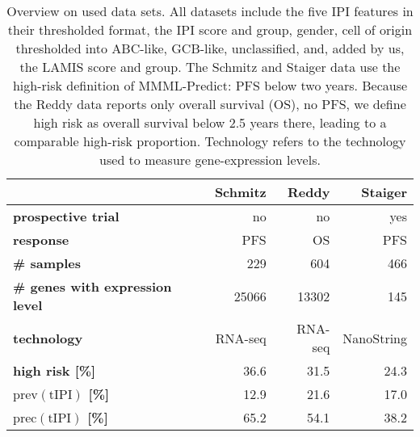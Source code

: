 \begin{table}
    \centering
    \begin{tabular}{lrrr}
        \hline
        & \textbf{Schmitz} & \textbf{Reddy} & \textbf{Staiger} \\
        \hline
        \textbf{prospective trial} & no & no & yes \\
        \textbf{response} & PFS & OS & PFS \\
        \textbf{\# samples} & \num{229} & \num{604} & \num{466} \\
        \textbf{\# genes with expression level} & \num{25066} & \num{13302} & \num{145} \\
        \textbf{technology} & RNA-seq & RNA-seq & NanoString \\
        \textbf{high risk [\%]} & \num{36.6} & \num{31.5} & \num{24.3} \\
        \textbf{$\text{prev}(\text{tIPI})$ [\%]} & \num{12.9} & \num{21.6} & \num{17.0} \\
        \textbf{$\text{prec}(\text{tIPI})$ [\%]} & \num{65.2} & \num{54.1} & \num{38.2} \\
        \hline
    \end{tabular}
    \caption{Overview on used data sets. All datasets include the five IPI features in their 
        thresholded format, the IPI score and group, gender, cell of origin thresholded into 
        ABC-like, GCB-like, unclassified, and, added 
        by us, the LAMIS score and group. The Schmitz and Staiger data use the high-risk definition of 
        MMML-Predict: PFS below two years. Because the Reddy data reports only overall survival 
        (OS), no PFS, we define high risk as overall survival below \num{2.5} years there, leading 
        to a comparable high-risk proportion. Technology refers to the technology used to measure 
        gene-expression levels.}
        \label{table:data}
\end{table}